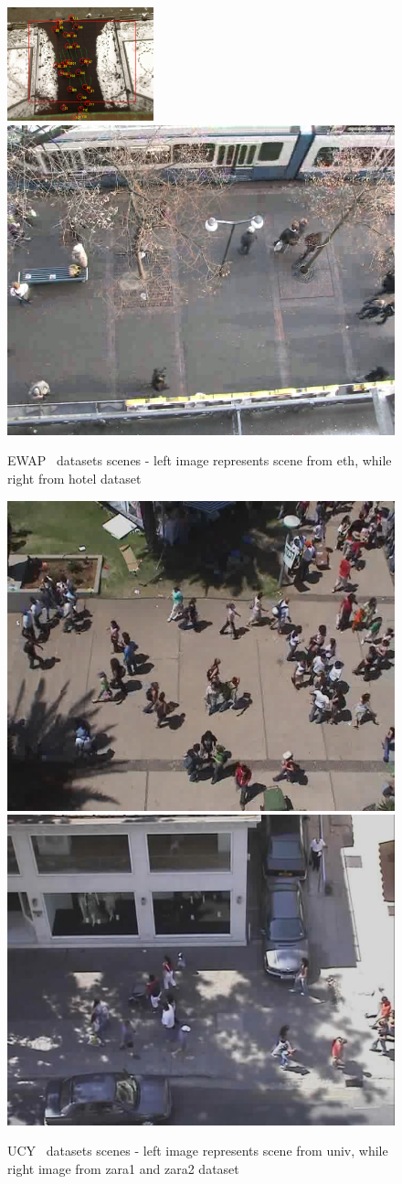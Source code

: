 \begin{figure}[h]
  \centering
  \includegraphics[width=0.40\linewidth]{./figures/image-biwi.png}
  \includegraphics[width=0.40\linewidth]{./figures/biwi-hotel.png}
  \caption{EWAP~\protect\footnotemark{\ref{fn:eth-dataset}} datasets scenes - left image represents scene from eth, while right from hotel dataset \cite[]{UCY-crowds}}\label{fig:eth-dataset-scenes}
\end{figure}

\begin{figure}[h]
  \centering
  \includegraphics[width=0.40\linewidth]{./figures/students_003.jpg}
  \includegraphics[width=0.40\linewidth]{./figures/crowds_zara01.jpg} %
  \caption{UCY~\protect\footnotemark{\ref{fn:ucy-dataset}} datasets scenes - left image represents scene from univ, while right image from zara1 and zara2 dataset \cite[]{ETH-biwi}}\label{fig:crowds-dataset-scenes}
\end{figure}


